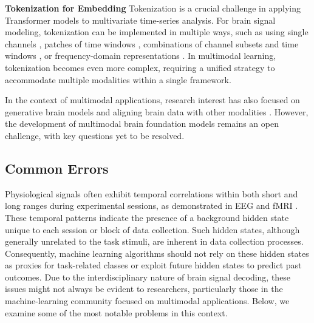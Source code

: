 \documentclass[journal]{IEEEtran}
\begin{document}
\textbf{Tokenization for Embedding} Tokenization is a crucial challenge in applying Transformer models to multivariate time-series analysis. For brain signal modeling, tokenization can be implemented in multiple ways, such as using single channels \cite{Zhang2022a, Yang2023}, patches of time windows \cite{Zhang2023Brant, Wang2024b}, combinations of channel subsets and time windows \cite{Jiang2024LaBraM}, or frequency-domain representations \cite{Wang2023BrainBERT}. In multimodal learning, tokenization becomes even more complex, requiring a unified strategy to accommodate multiple modalities within a single framework.

In the context of multimodal applications, research interest has also focused on generative brain models \cite{Mai2024} and aligning brain data with other modalities \cite{Xia2024a}. However, the development of multimodal brain foundation models remains an open challenge, with key questions yet to be resolved.

\subsection{Common Errors} \label{sect:pitfall}

Physiological signals often exhibit temporal correlations within both short and long ranges during experimental sessions, as demonstrated in EEG \cite{LinkenkaerHansen2001} and fMRI \cite{Bullmore2001}. These temporal patterns indicate the presence of a background hidden state unique to each session or block of data collection. Such hidden states, although generally unrelated to the task stimuli, are inherent in data collection processes. Consequently, machine learning algorithms should not rely on these hidden states as proxies for task-related classes or exploit future hidden states to predict past outcomes. Due to the interdisciplinary nature of brain signal decoding, these issues might not always be evident to researchers, particularly those in the machine-learning community focused on multimodal applications. Below, we examine some of the most notable problems in this context.
\end{document}
